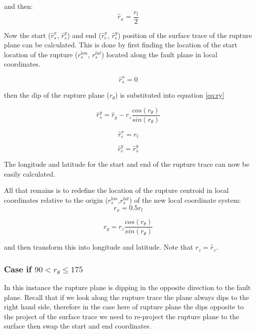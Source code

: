 and then:
\begin{equation}
\hat{r}_x = \frac{r_l}{2}
\end{equation}

Now the start ($\hat{r}_s^{x}$, $\hat{r}_s^{y}$) and end ($\hat{r}_e^{x}$, $\hat{r}_e^{y}$) position of the surface trace of the rupture plane can be calculated. This is done by first 
finding the location of the start location of the rupture ($r_s^{lon}$, $r_s^{lat}$) located along the fault 
plane in local coordinates. 

\begin{equation}\label{eq:rsx}
\hat{r}_s^{x} = 0
\end{equation}

then the dip of the rupture plane ($r_\theta$) is substituted into equation \ref{eq:ry}

\begin{equation}
\hat{r}_s^{y} = \hat{r}_y - r_z  \frac{cos(r_\theta)}{sin(r_\theta)}
\end{equation}

\begin{equation}\label{eq:rex}
\hat{r}_e^{x} = r_l
\end{equation}

\begin{equation}\label{eq:rey}
\hat{r}_e^{y} = \hat{r}_s^{y}
\end{equation}

The longitude and latitude for the start and end of the rupture trace can now be easily calculated.


All that remains is to redefine the location of the rupture centroid in local coordinates relative to the origin 
($r_s^{lon}$,$ r_s^{lat}$) of the new local coordinate system:
\begin{equation}\label{eq:rx}
r_x = 0.5 r_l
\end{equation}

\begin{equation} \label{eq:ry2}
r_y = r_z  \frac{cos(r_\theta)}{sin(r_\theta)}
\end{equation}

and then transform this into longitude and latitude. Note that $r_z = \hat{r}_z$.

\subsubsection{Case if $90 <  r_\theta \leq 175$} \label{sec:90t180}

In this instance the rupture plane is dipping in the opposite direction to the fault plane. Recall that if we look along 
the rupture trace the plane always dips to the right hand side, therefore in the case here of rupture plane the dips 
opposite to the project of the surface trace we need to re-project the rupture plane to the surface then swap the 
start and end coordinates. 


